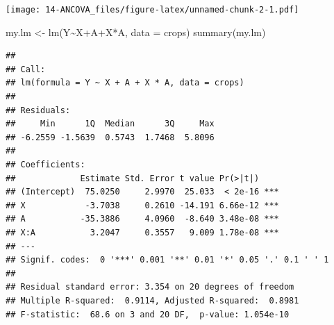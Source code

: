 \documentclass[
]{book}
\newenvironment{Shaded}{\begin{snugshade}}{\end{snugshade}}
\newcommand{\AttributeTok}[1]{\textcolor[rgb]{0.77,0.63,0.00}{#1}}
\newcommand{\DecValTok}[1]{\textcolor[rgb]{0.00,0.00,0.81}{#1}}
\newcommand{\FunctionTok}[1]{\textcolor[rgb]{0.00,0.00,0.00}{#1}}
\newcommand{\NormalTok}[1]{#1}
\newcommand{\OtherTok}[1]{\textcolor[rgb]{0.56,0.35,0.01}{#1}}
\newcommand{\SpecialCharTok}[1]{\textcolor[rgb]{0.00,0.00,0.00}{#1}}
\newcommand{\StringTok}[1]{\textcolor[rgb]{0.31,0.60,0.02}{#1}}
\begin{document}
\begin{Shaded}
\end{Shaded}

\texttt{[image: 14-ANCOVA\_files/figure-latex/unnamed-chunk-2-1.pdf]}

\begin{Shaded}
\begin{Highlighting}[]
\NormalTok{my.lm }\OtherTok{\textless{}{-}} \FunctionTok{lm}\NormalTok{(Y}\SpecialCharTok{\textasciitilde{}}\NormalTok{X}\SpecialCharTok{+}\NormalTok{A}\SpecialCharTok{+}\NormalTok{X}\SpecialCharTok{*}\NormalTok{A, }\AttributeTok{data =}\NormalTok{ crops)}
\FunctionTok{summary}\NormalTok{(my.lm)}
\end{Highlighting}
\end{Shaded}

\begin{verbatim}
## 
## Call:
## lm(formula = Y ~ X + A + X * A, data = crops)
## 
## Residuals:
##     Min      1Q  Median      3Q     Max 
## -6.2559 -1.5639  0.5743  1.7468  5.8096 
## 
## Coefficients:
##             Estimate Std. Error t value Pr(>|t|)    
## (Intercept)  75.0250     2.9970  25.033  < 2e-16 ***
## X            -3.7038     0.2610 -14.191 6.66e-12 ***
## A           -35.3886     4.0960  -8.640 3.48e-08 ***
## X:A           3.2047     0.3557   9.009 1.78e-08 ***
## ---
## Signif. codes:  0 '***' 0.001 '**' 0.01 '*' 0.05 '.' 0.1 ' ' 1
## 
## Residual standard error: 3.354 on 20 degrees of freedom
## Multiple R-squared:  0.9114, Adjusted R-squared:  0.8981 
## F-statistic:  68.6 on 3 and 20 DF,  p-value: 1.054e-10
\end{verbatim}
\end{document}

